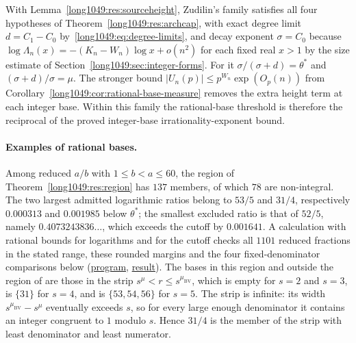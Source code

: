 \documentclass[11pt]{article}
\begin{document}
\noindent With Lemma~\ref{long1049:res:sourceheight}, Zudilin's family satisfies all four
hypotheses of Theorem~\ref{long1049:res:archcap}, with exact degree limit $d=C_1-C_0$
by~\eqref{long1049:eq:degree-limits}, and decay exponent $\sigma=C_0$ because
$\log\Lambda_n(x)=-(K_n-W_n)\log x+o(n^{2})$ for each fixed real $x>1$ by the
size estimate of Section~\ref{long1049:sec:integer-forms}.  For it $\sigma/(\sigma+d)=\theta^{*}$ and
$(\sigma+d)/\sigma=\mu$. The stronger bound
$|U_n(p)|\le p^{W_n}\exp(O_p(n))$ from
Corollary~\ref{long1049:cor:rational-base-measure} removes the extra height
term at each integer base. Within this family the rational-base
threshold is therefore the reciprocal of the proved integer-base
irrationality-exponent bound.

\paragraph{Examples of rational bases.}
Among reduced $a/b$ with $1\le b<a\le60$, the region of
Theorem~\ref{long1049:res:region} has $137$ members, of which $78$ are
non-integral. The two largest admitted logarithmic ratios belong to
$53/5$ and $31/4$, respectively $0.000313$ and $0.001985$ below
$\theta^*$; the smallest excluded ratio is that of $52/5$, namely
$0.4073243836\ldots$, which exceeds the cutoff by $0.001641$.
A calculation with rational bounds for logarithms and for the cutoff
checks all $1101$ reduced fractions in the stated range, these rounded
margins and the four fixed-denominator comparisons below
(\href{https://github.com/wcook04/plectis-erdos/blob/4beca4ad0c00a626def9c73f2420e20ebf8d1968/research/experiments/erdos1049/rational_base_examples.py}{program}, \href{https://github.com/wcook04/plectis-erdos/blob/4beca4ad0c00a626def9c73f2420e20ebf8d1968/research/experiments/erdos1049/receipts/rational-base-examples.json}{result}). The
bases in this region and outside the region of \cite{bv1994} are those in the strip
$s^{\mu}<r\le s^{\mu_{\mathrm{BV}}}$, which is empty for $s=2$ and $s=3$, is
$\{31\}$ for $s=4$, and is $\{53,54,56\}$ for $s=5$.  The strip is infinite:
its width $s^{\mu_{\mathrm{BV}}}-s^{\mu}$ eventually exceeds $s$, so for every
large enough denominator it contains an integer congruent to $1$ modulo $s$.
Hence $31/4$ is the member of the strip with least denominator and least numerator.
\end{document}
